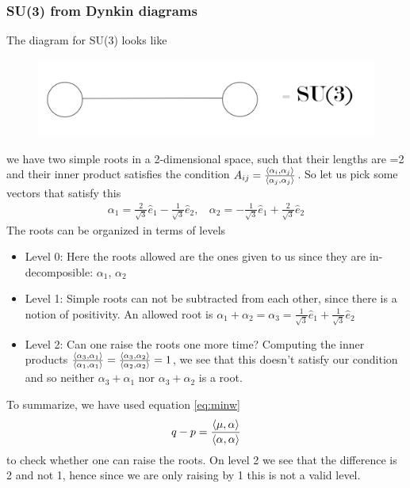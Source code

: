 \documentclass[a4paper,12pt]{article}
\begin{document}
\subsubsection{SU(3) from Dynkin diagrams}
The diagram for SU(3) looks like
\begin{figure}[H]
	\centering
	\includegraphics[width=0.4\linewidth]{30}
\end{figure} 
we have two simple roots in a 2-dimensional space, such that their lengths are =2 and their inner product satisfies the condition $	A_{ij}=\frac{\expval{\alpha_i,\alpha_j}}{\expval{\alpha_j,\alpha_j}}$. So let us pick some vectors that satisfy this
\begin{equation}
	\begin{aligned}
		\alpha_1=\frac{2}{\sqrt{3}}\hat{e}_1-\frac{1}{\sqrt{3}}\hat{e}_2,~~~~\alpha_2=-\frac{1}{\sqrt{3}}\hat{e}_1+\frac{2}{\sqrt{3}}\hat{e}_2
	\end{aligned}
\end{equation}
The roots can be organized in terms of levels
\begin{itemize}
	\item  Level 0: Here the roots allowed are the ones given to us since they are in-decomposible: $\alpha_1$, $\alpha_2$
	\item Level 1: Simple roots can not be subtracted from each other, since there is a notion of positivity. An allowed root is $\alpha_1+\alpha_2= \alpha_3=\frac{1}{\sqrt{3}}\hat{e}_1+\frac{1}{\sqrt{3}}\hat{e}_2$
	\item Level 2: Can one raise the roots one more time? Computing the inner products $\frac{\expval{\alpha_3,\alpha_1}}{\expval{\alpha_1,\alpha_1}}=\frac{\expval{\alpha_3,\alpha_2}}{\expval{\alpha_2,\alpha_2}}=1$, we see that this doesn't satisfy our condition and so neither $\alpha_3+\alpha_1$ nor $\alpha_3+\alpha_2$ is a root.
\end{itemize}
To summarize, we have used equation \eqref{eq:minw}
\begin{equation} 
	\begin{aligned}
		q-p=\frac{\expval{\mu,\alpha}}{\expval{\alpha,\alpha}}
	\end{aligned}
\end{equation}
to check whether one can raise the roots. On level 2 we see that the difference is 2 and not 1, hence since we are only raising by 1 this is not a valid level.
\newpage
\end{document}
